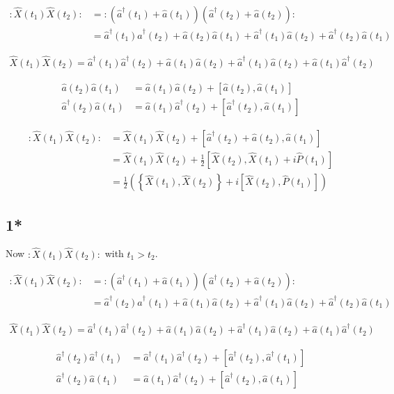 \documentclass[12pt]{article}
\newcommand{\ahat}{\hat{a}}
\newcommand{\adag}{\ahat^{\dag}}
\begin{document}
\begin{align}
:\hat{X}(t_1)\hat{X}(t_2): &= :(\adag(t_1)+\ahat(t_1))(\adag(t_2)+\ahat(t_2)):\\
&= \adag(t_1)\adag(t_2) + \ahat(t_2)\ahat(t_1) + \adag(t_1)\ahat(t_2) + \adag(t_2)\ahat(t_1)
\end{align}

\begin{align}
\hat{X}(t_1)\hat{X}(t_2) = \adag(t_1)\adag(t_2) + \ahat(t_1)\ahat(t_2) + \adag(t_1)\ahat(t_2) + \ahat(t_1)\adag(t_2)
\end{align}

\begin{align}
\ahat(t_2)\ahat(t_1) &= \ahat(t_1)\ahat(t_2) + \left[\ahat(t_2),\ahat(t_1)\right]\\
\adag(t_2)\ahat(t_1) &= \ahat(t_1)\adag(t_2) + \left[\adag(t_2),\ahat(t_1)\right]
\end{align}

\begin{align}
:\hat{X}(t_1)\hat{X}(t_2): &= \hat{X}(t_1)\hat{X}(t_2) + \left[\adag(t_2) + \ahat(t_2), \ahat(t_1)\right]\\
&= \hat{X}(t_1)\hat{X}(t_2) + \frac{1}{2} \left[\hat{X}(t_2), \hat{X}(t_1) + i \hat{P}(t_1)\right]\\
&= \frac{1}{2}\left(\left\{\hat{X}(t_1),\hat{X}(t_2)\right\} + i \left[\hat{X}(t_2),\hat{P}(t_1)\right]\right)
\end{align}

\pagebreak

\subsection{1*}

Now $:\hat{X}(t_1)\hat{X}(t_2):$ with $t_1>t_2$.

\begin{align}
:\hat{X}(t_1)\hat{X}(t_2): &= :(\adag(t_1)+\ahat(t_1))(\adag(t_2)+\ahat(t_2)):\\
&= \adag(t_2)\adag(t_1) + \ahat(t_1)\ahat(t_2) + \adag(t_1)\ahat(t_2) + \adag(t_2)\ahat(t_1)
\end{align}

\begin{align}
\hat{X}(t_1)\hat{X}(t_2) = \adag(t_1)\adag(t_2) + \ahat(t_1)\ahat(t_2) + \adag(t_1)\ahat(t_2) + \ahat(t_1)\adag(t_2)
\end{align}

\begin{align}
\adag(t_2)\adag(t_1) &= \adag(t_1)\adag(t_2) + \left[\adag(t_2),\adag(t_1)\right]\\
\adag(t_2)\ahat(t_1) &= \ahat(t_1)\adag(t_2) + \left[\adag(t_2),\ahat(t_1)\right]
\end{align}
\end{document}
